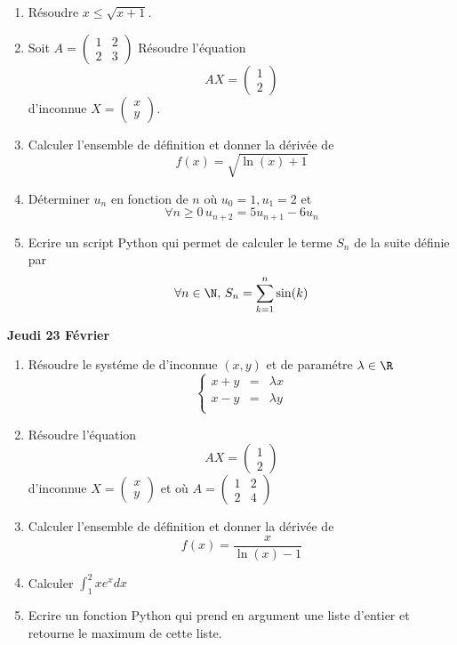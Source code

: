 \documentclass[a4paper, 11pt,reqno]{article}
\begin{document}
\begin{enumerate}
\item Résoudre $x\leq \sqrt{x+1}$.
\item Soit $A=\begin{pmatrix}
1 & 2\\
2 & 3
\end{pmatrix}$ Résoudre l'équation
$$
AX=\begin{pmatrix}
1\\
2
\end{pmatrix}$$
 d'inconnue $X=\begin{pmatrix}
x\\y
\end{pmatrix}$.
\item Calculer l'ensemble de définition et donner la dérivée de $$f(x) =\sqrt{ \ln(x) +1}$$
\item Déterminer $u_n$ en fonction de $n$ où $u_0=1, u_1=2$ et 
$$\forall n \geq 0\, u_{n+2} =5u_{n+1}-6u_n$$
\item Ecrire un script Python qui permet de calculer le terme $S_n$ de la suite définie par 
$$\forall n \in \N, \, S_{n} = \sum_{k=1}^n\sin(k)$$
\end{enumerate}



\begin{center}
\textbf{Jeudi 23 Février }
\end{center}
\begin{enumerate}
\item Résoudre le systéme de d'inconnue $(x,y)$ et de paramétre $\lambda \in \R$
$$\left\{ \begin{array}{ccc}
x+y&=& \lambda x\\
x-y&=& \lambda y\\
\end{array}\right.$$

\item Résoudre l'équation
$$
AX=\begin{pmatrix}
1\\
2
\end{pmatrix}$$
 d'inconnue $X=\begin{pmatrix}
x\\y
\end{pmatrix}$  et où $A=\begin{pmatrix}
1 & 2\\
2 & 4
\end{pmatrix}$
\item Calculer l'ensemble de définition et donner la dérivée de $$f(x) =\frac{x}{\ln(x)-1}$$
\item Calculer $\int_1^2 xe^xdx$
\item Ecrire un fonction Python qui prend en argument une liste d'entier et retourne le maximum de cette liste. 
\end{enumerate}
\end{document}
